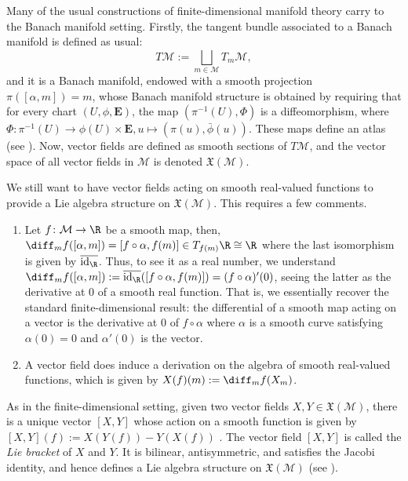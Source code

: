 Many of the usual constructions of finite-dimensional manifold theory carry to the Banach manifold setting. Firstly, the tangent bundle associated to a Banach manifold is defined as usual:
\[
T\mathcal{M}:=\bigsqcup_{m\in \mathcal{M}} T_m\mathcal{M},
\]
and it is a Banach manifold, endowed with a smooth projection \(\pi([\alpha, m])=m\), whose Banach manifold structure is obtained by requiring that for every chart \((U, \phi, \mathbf{E})\), the map \((\pi^{-1}(U), \Phi)\) is a diffeomorphism, where \(\Phi\colon \pi^{-1}(U)\to \phi(U) \times \mathbf{E}, u \mapsto(\pi(u), \bar\phi(u))\). These maps define an atlas (see \parencite[Sec. 1.1.5]{Schmeding_2022}). Now, vector fields are defined as smooth sections of \(T\mathcal{M}\), and the vector space of all vector fields in \(\mathcal{M}\) is denoted \(\mathfrak{X}(\mathcal{M})\). {\parskip=0pt
\begin{obs} \label{obs_vector_fields_and_differentials_inf_dim}
    We still want to have vector fields acting on smooth real-valued functions to provide a Lie algebra structure on \(\mathfrak{X}(\mathcal{M})\). This requires a few comments.
    \begin{enumerate}
        \item Let \(f \colon \mathcal{M} \to \R\) be a smooth map, then, \(\diff_mf([\alpha, m]) = [f \circ \alpha, f(m)] \in T_{f(m)}\R \cong \R\) where the last isomorphism is given by \(\overline{\mathrm{id}_\R}\). Thus, to see it as a real number, we understand \(\diff_mf([\alpha, m]):=\overline{\mathrm{id}_\R}([f\circ \alpha, f(m)])=(f \circ \alpha)'(0)\), seeing the latter as the derivative at \(0\) of a smooth real function. That is, we essentially recover the standard finite-dimensional result: the differential of a smooth map acting on a vector is the derivative at \(0\) of \(f \circ \alpha\) where \(\alpha\) is a smooth curve satisfying \(\alpha(0)=0\) and \(\alpha'(0)\) is the vector.
        \item A vector field does induce a derivation on the algebra of smooth real-valued functions, which is given by \(X(f)(m):=\diff_mf(X_m)\). 
    \end{enumerate}
\end{obs}
As in the finite-dimensional setting, given two vector fields \(X,Y \in \mathfrak{X}(\mathcal{M})\), there is a unique vector \([X,Y]\) whose action on a smooth function is given by \([X,Y](f):=X(Y(f))-Y(X(f))\) \parencite[Prop. V-1.1 and Prop V-1.3]{SergeLang}. The vector field \([X,Y]\) is called the \textit{Lie bracket} of \(X\) and \(Y\). It is bilinear, antisymmetric, and satisfies the Jacobi identity, and hence defines a Lie algebra structure on \(\mathfrak{X}(\mathcal{M})\) (see \parencite[Cor. 1.4]{SergeLang}). }

